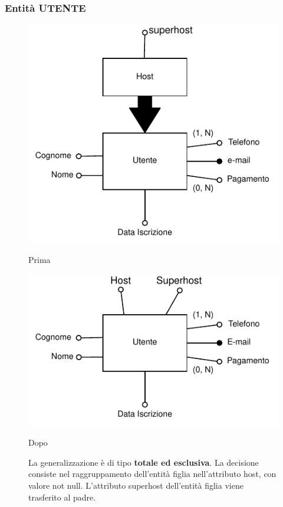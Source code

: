 \subsubsection{Entità UTENTE}
\begin{figure}[H]
      \centering
      \begin{minipage}[b]{0.45\textwidth}
            \includegraphics[width=\textwidth]{resources/pdf/page11.pdf}
            \caption{Prima}
      \end{minipage}
      \hfill
      \begin{minipage}[b]{0.45\textwidth}
            \includegraphics[width=\textwidth]{resources/pdf/page12.pdf}
            \caption{Dopo}
      \end{minipage}
      \caption*{La generalizzazione è di tipo \textbf{totale ed esclusiva}. La decisione consiste nel raggruppamento dell'entità figlia nell'attributo host, con valore not null. L'attributo superhost dell'entità figlia viene trasferito al padre.}
\end{figure}


